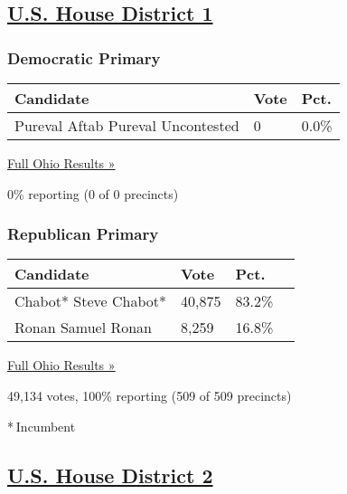 \hypertarget{us-house-district-1}{%
\subsection{\texorpdfstring{\href{https://www.nytimes3xbfgragh.onion/elections/results/ohio-house-district-1-primary-election}{U.S.
House District 1}}{U.S. House District 1}}\label{us-house-district-1}}

\hypertarget{democratic-primary-2}{%
\subsubsection{Democratic Primary}\label{democratic-primary-2}}

\begin{longtable}[]{@{}lll@{}}
\toprule
Candidate & Vote & Pct.\tabularnewline
\midrule
\endhead
 Pureval Aftab Pureval Uncontested & 0 & 0.0\%\tabularnewline
\bottomrule
\end{longtable}

\href{https://www.nytimes3xbfgragh.onion/elections/results/ohio}{Full
Ohio Results »}

0\% reporting (0 of 0 precincts)

\hypertarget{republican-primary-2}{%
\subsubsection{Republican Primary}\label{republican-primary-2}}

\begin{longtable}[]{@{}llll@{}}
\toprule
Candidate & Vote & Pct. &\tabularnewline
\midrule
\endhead
 Chabot* Steve Chabot* & 40,875 & 83.2\% &\tabularnewline
 Ronan Samuel Ronan & 8,259 & 16.8\% &\tabularnewline
\bottomrule
\end{longtable}

\href{https://www.nytimes3xbfgragh.onion/elections/results/ohio}{Full
Ohio Results »}

49,134 votes, 100\% reporting (509 of 509 precincts)

* Incumbent

\hypertarget{us-house-district-2}{%
\subsection{\texorpdfstring{\href{https://www.nytimes3xbfgragh.onion/elections/results/ohio-house-district-2-primary-election}{U.S.
House District 2}}{U.S. House District 2}}\label{us-house-district-2}}

